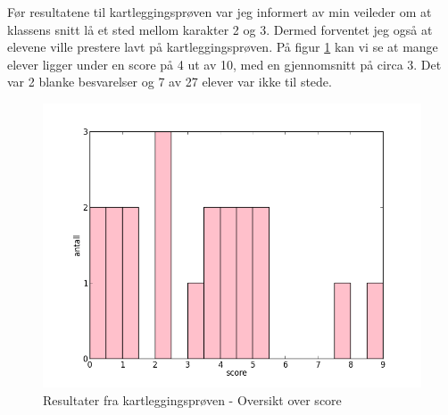 \documentclass[main.tex]{subfiles}
\begin{document}
Før resultatene til kartleggingsprøven var jeg informert av min veileder om at klassens snitt lå et sted mellom
karakter 2 og 3. Dermed forventet jeg også at elevene ville prestere lavt på kartleggingsprøven. På figur 
\ref{fig:scoreoversikt} kan vi se at mange elever ligger under en score på 4 ut av 10, med en gjennomsnitt 
på circa 3. Det var 2 blanke besvarelser og 7 av 27 elever var ikke til stede.
\begin{figure}[h!]
\centering
\includegraphics[scale = 0.5]{../figures/scoreoversikt.png}
\caption{Resultater fra kartleggingsprøven - Oversikt over score}
\label{fig:scoreoversikt}
\end{figure}
\end{document}
